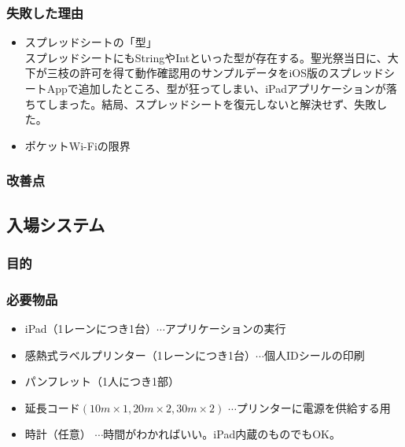\documentclass[dvipdfmx,jb5]{jarticle}
\begin{document}
\subsubsection{失敗した理由}
 \begin{itemize}
  \item スプレッドシートの「型」\\
  スプレッドシートにもStringやIntといった型が存在する。聖光祭当日に、大下が三枝の許可を得て動作確認用のサンプルデータをiOS版のスプレッドシートAppで追加したところ、型が狂ってしまい、iPadアプリケーションが落ちてしまった。結局、スプレッドシートを復元しないと解決せず、失敗した。
  \item ポケットWi-Fiの限界\\


 \end{itemize}
\subsubsection{改善点}
\subsection{入場システム}
\subsubsection{目的}
\subsubsection{必要物品}
 \begin{itemize}
 \item iPad（1レーンにつき1台）$\cdots$アプリケーションの実行
 \item 感熱式ラベルプリンター（1レーンにつき1台）$\cdots$個人IDシールの印刷
 \item パンフレット（1人につき1部）
 \item 延長コード$(10m\times1,20m\times2,30m\times2)$ $\cdots$プリンターに電源を供給する用
 \item 時計（任意） $\cdots$時間がわかればいい。iPad内蔵のものでもOK。
 \end{itemize}
\end{document}
